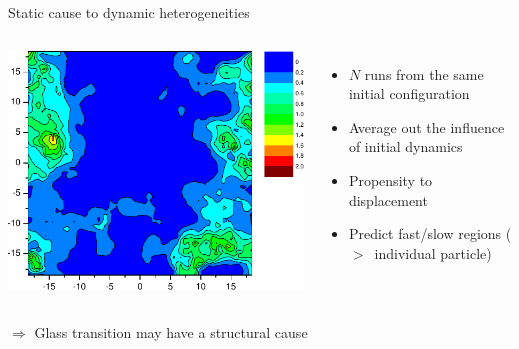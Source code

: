 \documentclass{beamer}
\begin{document}
\begin{frame}{Static cause to dynamic heterogeneities}
	\begin{columns}
	\centering
	\includegraphics[width=\columnwidth]{propensity}
	{\footnotesize\citet{Widmer-Cooper2005}}
	\begin{itemize}
		\item $N$ runs from the same initial configuration
		\item Average out the influence of initial dynamics
		\item Propensity to displacement
		\item Predict fast/slow \alert{regions} ($>$~individual particle)\\{\footnotesize\citet{Berthier2007}}
	\end{itemize}
	\end{columns}
	
	\bigskip$\Rightarrow$ Glass transition may have a structural cause
\end{frame}
\end{document}
